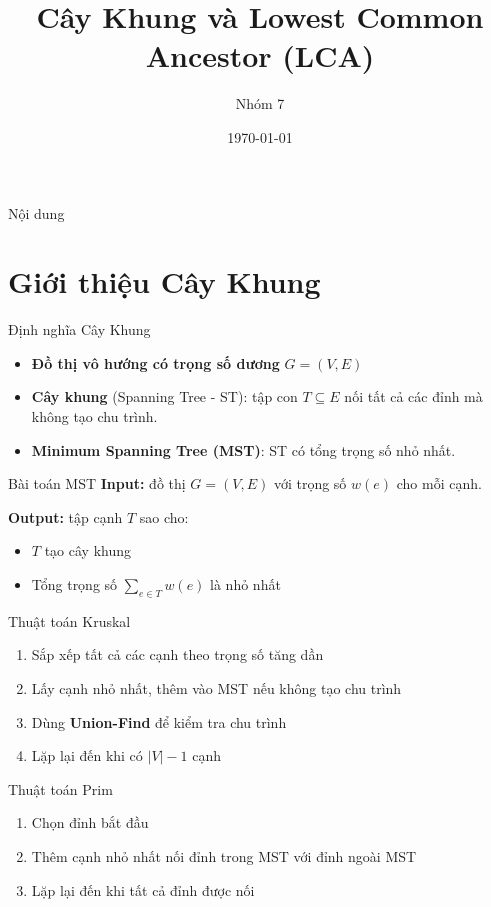 \documentclass[aspectratio=169]{beamer}
\title{Cây Khung và Lowest Common Ancestor (LCA)}
\author{Nhóm 7}
\date{\today}
\begin{document}
\frame{\titlepage}

\begin{frame}{Nội dung}
\tableofcontents
\end{frame}

\section{Giới thiệu Cây Khung}
\begin{frame}{Định nghĩa Cây Khung}
\begin{itemize}
    \item \textbf{Đồ thị vô hướng có trọng số dương} $G=(V,E)$
    \item \textbf{Cây khung} (Spanning Tree - ST): tập con $T\subseteq E$ nối tất cả các đỉnh mà không tạo chu trình.
    \item \textbf{Minimum Spanning Tree (MST)}: ST có tổng trọng số nhỏ nhất.
\end{itemize}
\end{frame}

\begin{frame}{Bài toán MST}
\textbf{Input:} đồ thị $G=(V,E)$ với trọng số $w(e)$ cho mỗi cạnh.

\textbf{Output:} tập cạnh $T$ sao cho:
\begin{itemize}
    \item $T$ tạo cây khung
    \item Tổng trọng số $\sum_{e\in T} w(e)$ là nhỏ nhất
\end{itemize}
\end{frame}

\begin{frame}{Thuật toán Kruskal}
\begin{enumerate}
    \item Sắp xếp tất cả các cạnh theo trọng số tăng dần
    \item Lấy cạnh nhỏ nhất, thêm vào MST nếu không tạo chu trình
    \item Dùng \textbf{Union-Find} để kiểm tra chu trình
    \item Lặp lại đến khi có $|V|-1$ cạnh
\end{enumerate}
\end{frame}

\begin{frame}{Thuật toán Prim}
\begin{enumerate}
    \item Chọn đỉnh bắt đầu
    \item Thêm cạnh nhỏ nhất nối đỉnh trong MST với đỉnh ngoài MST
    \item Lặp lại đến khi tất cả đỉnh được nối
\end{enumerate}
\end{frame}
\end{document}
